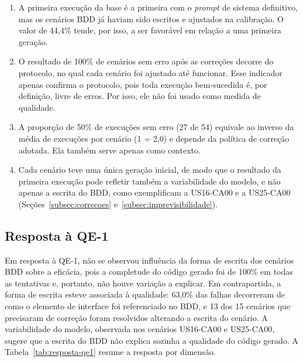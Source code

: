 \begin{enumerate}
    \item A primeira execução da base é a primeira com o \textit{prompt} de sistema definitivo, mas os cenários BDD já haviam sido escritos e ajustados na calibração. O valor de 44,4\% tende, por isso, a ser favorável em relação a uma primeira geração.
    \item O resultado de 100\% de cenários sem erro após as correções decorre do protocolo, no qual cada cenário foi ajustado até funcionar. Esse indicador apenas confirma o protocolo, pois toda execução bem-sucedida é, por definição, livre de erros. Por isso, ele não foi usado como medida de qualidade.
    \item A proporção de 50\% de execuções sem erro (27 de 54) equivale ao inverso da média de execuções por cenário (1 ÷ 2,0) e depende da política de correção adotada. Ela também serve apenas como contexto.
    \item Cada cenário teve uma única geração inicial, de modo que o resultado da primeira execução pode refletir também a variabilidade do modelo, e não apenas a escrita do BDD, como exemplificam a US16-CA00 e a US25-CA00 (Seções~\ref{subsec:correcoes} e~\ref{subsec:imprevisibilidade}).
\end{enumerate}

\subsection{Resposta à QE-1}
\label{subsec:resposta-qe1}

Em resposta à QE-1, não se observou influência da forma de escrita dos cenários BDD sobre a eficácia, pois a completude do código gerado foi de 100\% em todas as tentativas e, portanto, não houve variação a explicar. Em contrapartida, a forma de escrita esteve associada à qualidade: 63,0\% das falhas decorreram de como o elemento de interface foi referenciado no BDD, e 13 dos 15 cenários que precisaram de correção foram resolvidos alterando a escrita do cenário. A variabilidade do modelo, observada nos cenários US16-CA00 e US25-CA00, sugere que a escrita do BDD não explica sozinha a qualidade do código gerado. A Tabela~\ref{tab:resposta-qe1} resume a resposta por dimensão.

